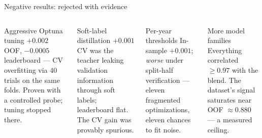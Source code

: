 \documentclass[aspectratio=169,10pt]{beamer}
\begin{document}
\begin{frame}{Negative results: rejected with evidence}
  \begin{columns}[t]
    \begin{alertblock}{Aggressive Optuna tuning}\scriptsize
      $+0.002$ OOF, $-0.0005$ leaderboard --- CV overfitting via 40 trials on the same folds.
      Proven with a controlled probe; tuning stopped there.
    \end{alertblock}
    \begin{alertblock}{Soft-label distillation}\scriptsize
      $+0.001$ CV was the teacher leaking validation information through soft labels;
      leaderboard flat. The CV gain was provably spurious.
    \end{alertblock}
    \begin{alertblock}{Per-year thresholds}\scriptsize
      In-sample $+0.001$; \emph{worse} under split-half verification ---
      eleven fragmented optimizations, eleven chances to fit noise.
    \end{alertblock}
    \begin{alertblock}{More model families}\scriptsize
      Everything correlated $\ge 0.97$ with the blend. The dataset's signal saturates
      near OOF $\approx 0.880$ --- a measured ceiling.
    \end{alertblock}
  \end{columns}
\end{frame}
\end{document}
